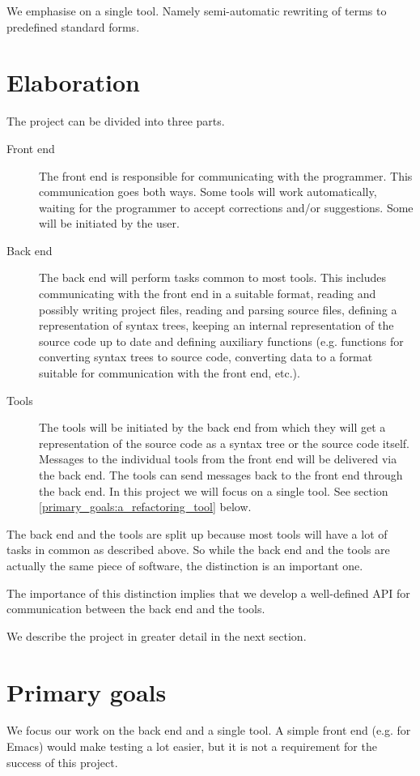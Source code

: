 \documentclass[a4paper,oneside]{article}
\begin{document}
We emphasise on a single tool. Namely semi-automatic rewriting of terms to predefined standard
forms. 

\section{Elaboration}
The project can be divided into three parts.
\begin{description}
\item[Front end] The front end is responsible for communicating with the programmer. This
communication goes both ways. Some tools will work automatically, waiting for the programmer to
accept corrections and/or suggestions. Some will be initiated by the user.
\item[Back end] The back end will perform tasks common to most tools. This includes communicating
with the front end in a suitable format, reading and possibly writing project files, reading and
parsing source files, defining a representation of syntax trees, keeping an internal representation
of the source code up to date and defining auxiliary functions (e.g. functions for converting syntax
trees to source code, converting data to a format suitable for communication with the front end,
etc.).
\item[Tools] The tools will be initiated by the back end from which they will get a representation
of the source code as a syntax tree or the source code itself. Messages to the individual tools from
the front end will be delivered via the back end. The tools can send messages back to the front end
through the back end. In this project we will focus on a single tool. See section
\ref{primary_goals:a_refactoring_tool} below.
\end{description}

The back end and the tools are split up because most tools will have a lot of tasks in common as
described above.  So while the back end and the tools are actually the same piece of software, the
distinction is an important one.

The importance of this distinction implies that we develop a well-defined API for communication
between the back end and the tools.

We describe the project in greater detail in the next section.

\section{Primary goals}
We focus our work on the back end and a single tool. A simple front end (e.g. for Emacs) would make
testing a lot easier, but it is not a requirement for the success of this project.
\end{document}
